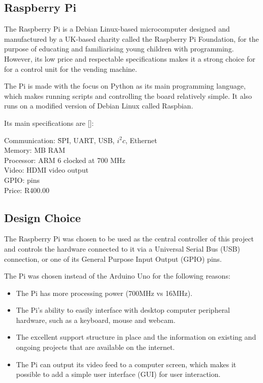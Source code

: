 \subsection{Raspberry Pi}
\label{sec:raspi}

The Raspberry Pi is a Debian Linux-based microcomputer
designed and manufactured by a UK-based charity called the Raspberry Pi Foundation, for the
purpose of educating and familiarising young children with programming. However, its low price
and respectable specifications makes it a strong choice for for a control unit for the vending
machine.

The Pi is made with the focus on Python as its main programming language, which makes running
scripts and controlling the board relatively simple. It also runs on a modified version of
Debian Linux called Raspbian.

Its main specifications are [\cite{website:raspi-specs}]:

\begin{tabbing}

Communication: \= SPI, UART, USB, $i^2c$, Ethernet \\ 
Memory:  MB RAM \\
Processor: \> ARM 6 clocked at 700 MHz \\
Video: \> HDMI video output \\
GPIO:  pins \\
Price: \> R400.00 \\

\end{tabbing} 

\subsection{Design Choice}

The Raspberry Pi was chosen to be used as the central controller of this project and
controls the hardware connected to it via a Universal Serial Bus (USB) connection, or one of
its General Purpose Input Output (GPIO) pins.

The Pi was chosen instead of the Arduino Uno for the following reasons:

\begin{itemize}
  
  \item The Pi has more processing power (700MHz vs 16MHz).
  \item The Pi's ability to easily interface with desktop computer peripheral hardware,
  such as a keyboard, mouse and webcam.
  \item The excellent support structure in place and the information on existing and ongoing
  projects that are available on the internet.
  \item The Pi can output its video feed to a computer screen, which makes it possible to
  add a simple user interface (GUI) for user interaction. 

\end{itemize}

